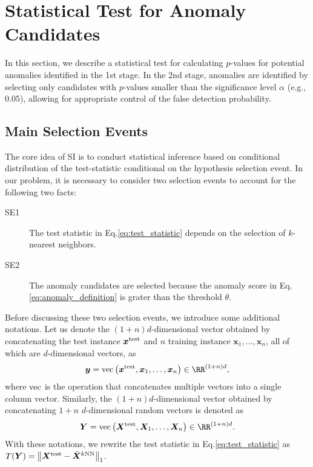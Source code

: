 \section{Statistical Test for Anomaly Candidates}
\label{sec:SI}
%
In this section, we describe a statistical test for calculating $p$-values for potential anomalies identified in the 1st stage.
%
In the 2nd stage, anomalies are identified by selecting only candidates with $p$-values smaller than the significance level $\alpha$ (e.g., 0.05), allowing for appropriate control of the false detection probability.

\subsection{Main Selection Events}
%
The core idea of SI is to conduct statistical inference based on conditional distribution of the test-statistic conditional on the hypothesis selection event.
%
In our problem, it is necessary to consider two selection events to account for the following two facts: 
%
\begin{description}
 \item[SE1] The test statistic in Eq.\eqref{eq:test_statistic} depends on the selection of $k$-nearest neighbors.
 \item[SE2] The anomaly candidates are selected because the anomaly score in Eq.\ref{eq:anomaly_definition} is grater than the threshold $\theta$.
\end{description}

Before discussing these two selection events, we introduce some additional notations. 
%
Let us denote the $(1+n)d$-dimensional vector obtained by concatenating the test instance $\bm x^{\rm test}$ and $n$ training instance $\bm x_1, \ldots, \bm x_n$, all of which are $d$-dimensional vectors, as  
\begin{align}
\bm y = {\rm vec} \left( \bm x^{\rm test}, \bm x_1, \ldots, \bm x_n \right) \in \RR^{(1+n)d},
\end{align}
where ${\rm vec}$ is the operation that concatenates multiple vectors into a single column vector.  
%
Similarly, the $(1+n)d$-dimensional vector obtained by concatenating $1+n$ $d$-dimensional random vectors is denoted as  
\begin{align}
\bm Y = {\rm vec} \left( \bm X^{\rm test}, \bm X_1, \ldots, \bm X_n \right) \in \RR^{(1+n)d}.
\end{align}
%
With these notations, we rewrite the test statistic in Eq.\eqref{eq:test_statistic} as $T(\bm Y) = \left\| \bm X^{\rm test} - \bar{\bm X}^{\text{$k$NN}} \right\|_1$.

